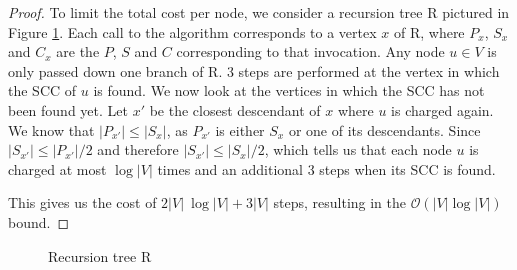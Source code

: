 \documentclass[../master/master.tex]{subfiles}
\begin{document}
\begin{proof}
  To limit the total cost per node, we consider a recursion tree R pictured in Figure \ref{R}. Each call to the algorithm corresponds to a vertex $x$ of R, where $P_x$, $S_x$ and $C_x$ are the $P$, $S$ and $C$ corresponding to that invocation. Any node $u \in V$ is only passed down one branch of R. 3 steps are performed at the vertex in which the SCC of $u$ is found. We now look at the vertices in which the SCC has not been found yet. Let $x'$ be the closest descendant of $x$ where $u$ is charged again. We know that $|P_{x'}|\leq |S_x|$, as $P_{x'}$ is either $S_x$ or one of its descendants. Since $|S_{x'}|\leq |P_{x'}|/2$ and therefore $|S_{x'}|\leq |S_{x}|/2$, which tells us that each node $u$ is charged at most $\log |V|$ times and an additional 3 steps when its SCC is found.

  This gives us the cost of $2|V|\ \log |V| + 3|V|$ steps, resulting in the $\mathcal{O}(|V|\log |V|)$ bound.
\end{proof}
\begin{figure}
  \centering
{}
\caption{Recursion tree R}
\label{R}
\end{figure}
\end{document}
